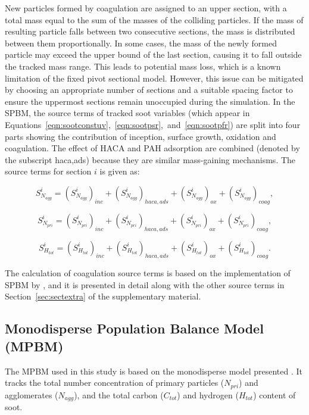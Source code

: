 New particles formed by coagulation are assigned to an upper section, with a total mass equal to the sum of the masses of the colliding particles. If the mass of resulting particle falls between two consecutive sections, the mass is distributed between them proportionally. In some cases, the mass of the newly formed particle may exceed the upper bound of the last section, causing it to fall outside the tracked mass range. This leads to potential mass loss, which is a known limitation of the fixed pivot sectional model. However, this issue can be mitigated by choosing an appropriate number of sections and a suitable spacing factor to ensure the uppermost sections remain unoccupied during the simulation. In the SPBM, the source terms of tracked soot variables (which appear in Equations~\ref{eqn:sootconstuv},~\ref{eqn:sootpsr},~and~\ref{eqn:sootpfr}) are split into four parts showing the contribution of inception, surface growth, oxidation and coagulation. The effect of HACA and PAH adsorption are combined (denoted by the subscript haca,ads) because they are similar mass-gaining mechanisms. The source terms for section $i$ is given as:

\begin{equation}
	S^i_{N_{agg}} = 
	\left(S^i_{N_{agg}}\right)_{inc}
	+\left(S^i_{N_{agg}}\right)_{haca, ads}
	+\left(S^i_{N_{agg}}\right)_{ox}
	+\left(S^i_{N_{agg}}\right)_{coag}
	\label{eqn:S_Naggsect},
\end{equation}

\begin{equation}
	S^i_{N_{pri}} = 
	\left(S^i_{N_{pri}}\right)_{inc}
	+\left(S^i_{N_{pri}}\right)_{haca, ads}
	+\left(S^i_{N_{pri}}\right)_{ox}
	+\left(S^i_{N_{pri}}\right)_{coag}
	\label{eqn:S_Nprisect},
\end{equation}

\begin{equation}
	S^i_{H_{tot}} = 
	\left(S^i_{H_{tot}}\right)_{inc}
	+\left(S^i_{H_{tot}}\right)_{haca, ads}
	+\left(S^i_{H_{tot}}\right)_{ox}
	+\left(S^i_{H_{tot}}\right)_{coag}
	\label{eqn:S_Htotsect}.
\end{equation}

The calculation of coagulation source terms is based on the implementation of SPBM by \citet{veshkini2015understanding}, and it is presented in detail along with the other source terms in Section~\ref{sec:sectextra} of the supplementary material.


\subsection{Monodisperse Population Balance Model (MPBM)}
\label{sec:mpbm}
The MPBM used in this study is based on the monodisperse model presented \citep{kholghy2021surface}. It tracks the total number concentration of primary particles ($N_{pri}$) and agglomerates ($N_{agg}$), and the total carbon ($C_{tot}$) and hydrogen ($H_{tot}$) content of soot.

